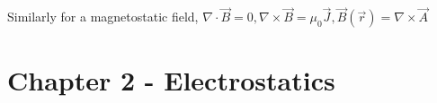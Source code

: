 \documentclass[11 pt, twoside]{article}
\newenvironment{outline*}
{
	\begin{outline}[enumerate]
	}
	{\end{outline}
}
\begin{document}
\begin{outline*}
		\3 Similarly for a magnetostatic field, $\nabla \cdot \vec{B} = 0, \nabla \times \vec{B} = \mu_0 \vec{J}, \vec{B}(\vec{r}) = \nabla \times \vec{A}$
\end{outline*}
\section{Chapter 2 - Electrostatics}
\end{document}
